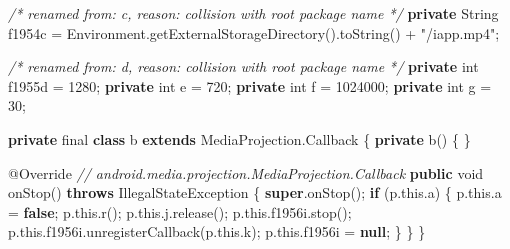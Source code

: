 \documentclass[
]{article}
\newenvironment{Shaded}{}{}
\newcommand{\AttributeTok}[1]{\textcolor[rgb]{0.49,0.56,0.16}{#1}}
\newcommand{\BuiltInTok}[1]{\textcolor[rgb]{0.00,0.50,0.00}{#1}}
\newcommand{\CommentTok}[1]{\textcolor[rgb]{0.38,0.63,0.69}{\textit{#1}}}
\newcommand{\ControlFlowTok}[1]{\textcolor[rgb]{0.00,0.44,0.13}{\textbf{#1}}}
\newcommand{\DataTypeTok}[1]{\textcolor[rgb]{0.56,0.13,0.00}{#1}}
\newcommand{\DecValTok}[1]{\textcolor[rgb]{0.25,0.63,0.44}{#1}}
\newcommand{\FunctionTok}[1]{\textcolor[rgb]{0.02,0.16,0.49}{#1}}
\newcommand{\KeywordTok}[1]{\textcolor[rgb]{0.00,0.44,0.13}{\textbf{#1}}}
\newcommand{\NormalTok}[1]{#1}
\newcommand{\OperatorTok}[1]{\textcolor[rgb]{0.40,0.40,0.40}{#1}}
\newcommand{\StringTok}[1]{\textcolor[rgb]{0.25,0.44,0.63}{#1}}
\begin{document}
\begin{Shaded}
\begin{Highlighting}[]
    \CommentTok{/* renamed from: c, reason: collision with root package name */}
    \KeywordTok{private} \BuiltInTok{String}\NormalTok{ f1954c }\OperatorTok{=} \BuiltInTok{Environment}\OperatorTok{.}\FunctionTok{getExternalStorageDirectory}\OperatorTok{().}\FunctionTok{toString}\OperatorTok{()} \OperatorTok{+} \StringTok{"/iapp.mp4"}\OperatorTok{;}

    \CommentTok{/* renamed from: d, reason: collision with root package name */}
    \KeywordTok{private} \DataTypeTok{int}\NormalTok{ f1955d }\OperatorTok{=} \DecValTok{1280}\OperatorTok{;}
    \KeywordTok{private} \DataTypeTok{int}\NormalTok{ e }\OperatorTok{=} \DecValTok{720}\OperatorTok{;}
    \KeywordTok{private} \DataTypeTok{int}\NormalTok{ f }\OperatorTok{=} \DecValTok{1024000}\OperatorTok{;}
    \KeywordTok{private} \DataTypeTok{int}\NormalTok{ g }\OperatorTok{=} \DecValTok{30}\OperatorTok{;}

    \KeywordTok{private} \DataTypeTok{final} \KeywordTok{class}\NormalTok{ b }\KeywordTok{extends}\NormalTok{ MediaProjection}\OperatorTok{.}\FunctionTok{Callback} \OperatorTok{\{}
        \KeywordTok{private} \FunctionTok{b}\OperatorTok{()} \OperatorTok{\{}
        \OperatorTok{\}}

        \AttributeTok{@Override} \CommentTok{// android.media.projection.MediaProjection.Callback}
        \KeywordTok{public} \DataTypeTok{void} \FunctionTok{onStop}\OperatorTok{()} \KeywordTok{throws} \BuiltInTok{IllegalStateException} \OperatorTok{\{}
            \KeywordTok{super}\OperatorTok{.}\FunctionTok{onStop}\OperatorTok{();}
            \ControlFlowTok{if} \OperatorTok{(}\NormalTok{p}\OperatorTok{.}\FunctionTok{this}\OperatorTok{.}\FunctionTok{a}\OperatorTok{)} \OperatorTok{\{}
\NormalTok{                p}\OperatorTok{.}\FunctionTok{this}\OperatorTok{.}\FunctionTok{a} \OperatorTok{=} \KeywordTok{false}\OperatorTok{;}
\NormalTok{                p}\OperatorTok{.}\FunctionTok{this}\OperatorTok{.}\FunctionTok{r}\OperatorTok{();}
\NormalTok{                p}\OperatorTok{.}\FunctionTok{this}\OperatorTok{.}\FunctionTok{j}\OperatorTok{.}\FunctionTok{release}\OperatorTok{();}
\NormalTok{                p}\OperatorTok{.}\FunctionTok{this}\OperatorTok{.}\FunctionTok{f1956i}\OperatorTok{.}\FunctionTok{stop}\OperatorTok{();}
\NormalTok{                p}\OperatorTok{.}\FunctionTok{this}\OperatorTok{.}\FunctionTok{f1956i}\OperatorTok{.}\FunctionTok{unregisterCallback}\OperatorTok{(}\NormalTok{p}\OperatorTok{.}\FunctionTok{this}\OperatorTok{.}\FunctionTok{k}\OperatorTok{);}
\NormalTok{                p}\OperatorTok{.}\FunctionTok{this}\OperatorTok{.}\FunctionTok{f1956i} \OperatorTok{=} \KeywordTok{null}\OperatorTok{;}
            \OperatorTok{\}}
        \OperatorTok{\}}
    \OperatorTok{\}}


\end{Highlighting}
\end{Shaded}
\end{document}
